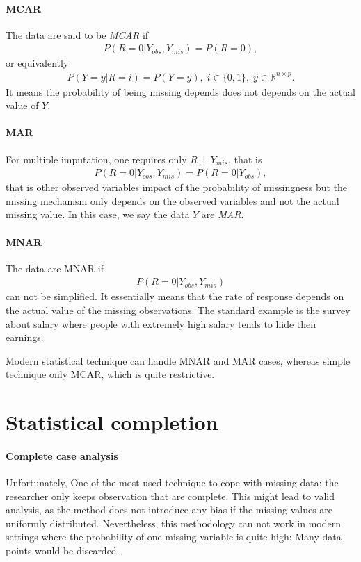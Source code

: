 \paragraph{MCAR}

The data are said to be \emph{MCAR} if
\begin{align*}
P(R=0 \vert Y_{obs}, Y_{mis}) = P(R=0),
\end{align*}
or equivalently
\begin{align*}
P(Y = y \vert R=i) = P(Y=y),\; i \in \{0, 1\},\; y \in \mathbb{R}^{n\times p}.
\end{align*}
It means the probability of being missing depends does not depends on the
actual value of $Y$.

\paragraph{MAR} For multiple imputation, one requires only $R \perp Y_{mis}$,
that is
\begin{align*}
  P(R=0 \vert Y_{obs}, Y_{mis}) = P(R=0 \vert Y_{obs}),
\end{align*}
that is other observed variables impact of the probability of missingness but
the missing mechanism only depends on the observed variables and not the actual
missing value. In this case, we say the data $Y$ are \emph{MAR}.

\paragraph{MNAR}
The data are MNAR if
\begin{align*}
  P(R=0 \vert Y_{obs}, Y_{mis})
\end{align*}
can not be simplified. It essentially means that the rate of response depends
on the actual value of the missing observations. The standard example is the
survey about salary where people with extremely high salary tends to hide their
earnings.

Modern statistical technique can handle MNAR and MAR cases, whereas simple technique only
MCAR, which is quite restrictive.

\section{Statistical completion}
\label{sec:stand-appr-miss}

\paragraph{Complete case analysis}
Unfortunately, One of the most used technique to cope with missing data: the
researcher only keeps observation that are complete. This might lead to valid
analysis, as the method does not introduce any bias if the missing values are
uniformly distributed. Nevertheless, this methodology can not work in modern
settings where the probability of one missing variable is quite high: Many data
points would be discarded.

